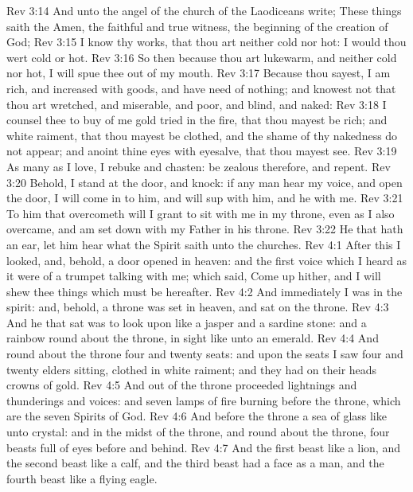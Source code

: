 \vs Rev 3:14 And unto the angel of the church of the Laodiceans write; These things saith the Amen, the faithful and true witness, the beginning of the creation of God;
\vs Rev 3:15 I know thy works, that thou art neither cold nor hot: I would thou wert cold or hot.
\vs Rev 3:16 So then because thou art lukewarm, and neither cold nor hot, I will spue thee out of my mouth.
\vs Rev 3:17 Because thou sayest, I am rich, and increased with goods, and have need of nothing; and knowest not that thou art wretched, and miserable, and poor, and blind, and naked:
\vs Rev 3:18 I counsel thee to buy of me gold tried in the fire, that thou mayest be rich; and white raiment, that thou mayest be clothed, and  the shame of thy nakedness do not appear; and anoint thine eyes with eyesalve, that thou mayest see.
\vs Rev 3:19 As many as I love, I rebuke and chasten: be zealous therefore, and repent.
\vs Rev 3:20 Behold, I stand at the door, and knock: if any man hear my voice, and open the door, I will come in to him, and will sup with him, and he with me.
\vs Rev 3:21 To him that overcometh will I grant to sit with me in my throne, even as I also overcame, and am set down with my Father in his throne.
\vs Rev 3:22 He that hath an ear, let him hear what the Spirit saith unto the churches.
\vs Rev 4:1 After this I looked, and, behold, a door  opened in heaven: and the first voice which I heard  as it were of a trumpet talking with me; which said, Come up hither, and I will shew thee things which must be hereafter.
\vs Rev 4:2 And immediately I was in the spirit: and, behold, a throne was set in heaven, and  sat on the throne.
\vs Rev 4:3 And he that sat was to look upon like a jasper and a sardine stone: and  a rainbow round about the throne, in sight like unto an emerald.
\vs Rev 4:4 And round about the throne  four and twenty seats: and upon the seats I saw four and twenty elders sitting, clothed in white raiment; and they had on their heads crowns of gold.
\vs Rev 4:5 And out of the throne proceeded lightnings and thunderings and voices: and  seven lamps of fire burning before the throne, which are the seven Spirits of God.
\vs Rev 4:6 And before the throne  a sea of glass like unto crystal: and in the midst of the throne, and round about the throne,  four beasts full of eyes before and behind.
\vs Rev 4:7 And the first beast  like a lion, and the second beast like a calf, and the third beast had a face as a man, and the fourth beast  like a flying eagle.

